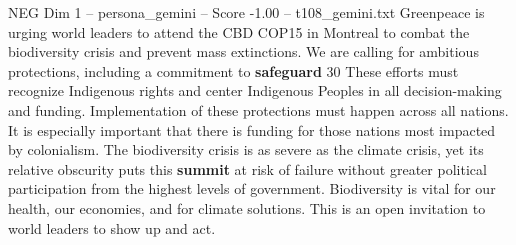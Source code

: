\begin{textsample}{NEG Dim 1 – persona\_gemini – Score -1.00 – t108\_gemini.txt}  \label{ex:f1_neg_011}
Greenpeace is urging world leaders to attend the CBD COP15 in Montreal to combat the biodiversity crisis and prevent mass extinctions.
We are calling for ambitious protections, including a commitment to \textbf{safeguard} 30 %
These efforts must recognize Indigenous rights and center Indigenous Peoples in all decision-making and funding.
Implementation of these protections must happen across all nations.
It is especially important that there is funding for those nations most impacted by colonialism.
The biodiversity crisis is as severe as the climate crisis, yet its relative obscurity puts this \textbf{summit} at risk of failure without greater political participation from the highest levels of government.
Biodiversity is vital for our health, our economies, and for climate solutions.
This is an open invitation to world leaders to show up and act.

\end{textsample}
